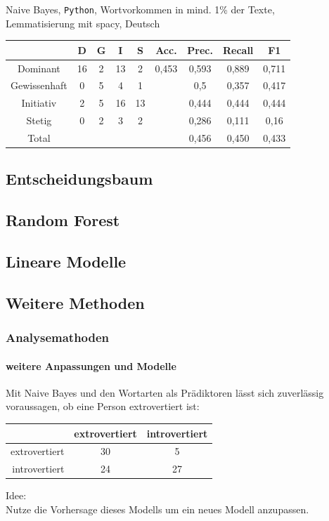 \documentclass{beamer}
\begin{document}
\begin{frame}
\begin{center}
Naive Bayes, \texttt{Python}, Wortvorkommen in mind. 1\% der Texte,\\
Lemmatisierung mit spacy, Deutsch\
\begin{tabular}{|c|c|c|c|c|c|c|c|c|}
\hline
 & D 	& G	& I & S	& Acc.	& Prec. & Recall	& F1\\
\hline
Dominant & 16 & 2 & 13 & 2 &0,453 & 0,593 & 0,889 & 0,711\\
Gewissenhaft & 0 & 5 & 4 & 1 & & 0,5 & 0,357 & 0,417\\
Initiativ & 2 & 5 & 16 & 13& & 0,444 & 0,444 & 0,444\\
Stetig & 0 & 2 & 3 & 2& & 0,286 & 0,111 & 0,16 \\
\hline
Total  &   &   &   &   & & 0,456  & 0,450   & 0,433\\
\hline
\end{tabular}
\end{center}
\end{frame}

\subsection{Entscheidungsbaum}
\subsection{Random Forest}
\subsection{Lineare Modelle}

\subsection{Weitere Methoden}
\begin{frame}
 \frametitle{Analysemathoden}
 \framesubtitle{weitere Anpassungen und Modelle}
 Mit Naive Bayes und den Wortarten als Prädiktoren lässt sich zuverlässig voraussagen,
 ob eine Person extrovertiert ist:\\
 \vspace{12pt}
 \begin{center}
 \begin{tabular}{r|c|c|}
  &  extrovertiert  & introvertiert \\
  \hline
  extrovertiert & 30 & 5  \\
  introvertiert & 24 & 27 \\
 \end{tabular} 
 \end{center}

 \vspace{12pt}
 
 Idee:\\
 Nutze die Vorhersage dieses Modells um ein neues Modell anzupassen.
\end{frame}
\end{document}
